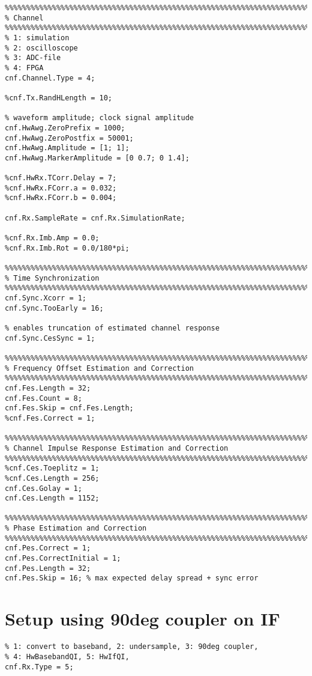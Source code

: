 \begin{appendix}
\begin{verbatim}
%%%%%%%%%%%%%%%%%%%%%%%%%%%%%%%%%%%%%%%%%%%%%%%%%%%%%%%%%%%%%%%%%%%%%%%%%%%%%%%%
% Channel
%%%%%%%%%%%%%%%%%%%%%%%%%%%%%%%%%%%%%%%%%%%%%%%%%%%%%%%%%%%%%%%%%%%%%%%%%%%%%%%%
% 1: simulation
% 2: oscilloscope
% 3: ADC-file
% 4: FPGA
cnf.Channel.Type = 4;

%cnf.Tx.RandHLength = 10;

% waveform amplitude; clock signal amplitude
cnf.HwAwg.ZeroPrefix = 1000;
cnf.HwAwg.ZeroPostfix = 50001;
cnf.HwAwg.Amplitude = [1; 1];
cnf.HwAwg.MarkerAmplitude = [0 0.7; 0 1.4];

%cnf.HwRx.TCorr.Delay = 7;
%cnf.HwRx.FCorr.a = 0.032;
%cnf.HwRx.FCorr.b = 0.004;

cnf.Rx.SampleRate = cnf.Rx.SimulationRate;

%cnf.Rx.Imb.Amp = 0.0;
%cnf.Rx.Imb.Rot = 0.0/180*pi;

%%%%%%%%%%%%%%%%%%%%%%%%%%%%%%%%%%%%%%%%%%%%%%%%%%%%%%%%%%%%%%%%%%%%%%%%%%%%%%%%
% Time Synchronization
%%%%%%%%%%%%%%%%%%%%%%%%%%%%%%%%%%%%%%%%%%%%%%%%%%%%%%%%%%%%%%%%%%%%%%%%%%%%%%%%
cnf.Sync.Xcorr = 1;
cnf.Sync.TooEarly = 16;

% enables truncation of estimated channel response
cnf.Sync.CesSync = 1;

%%%%%%%%%%%%%%%%%%%%%%%%%%%%%%%%%%%%%%%%%%%%%%%%%%%%%%%%%%%%%%%%%%%%%%%%%%%%%%%%
% Frequency Offset Estimation and Correction
%%%%%%%%%%%%%%%%%%%%%%%%%%%%%%%%%%%%%%%%%%%%%%%%%%%%%%%%%%%%%%%%%%%%%%%%%%%%%%%%
cnf.Fes.Length = 32;
cnf.Fes.Count = 8;
cnf.Fes.Skip = cnf.Fes.Length;
%cnf.Fes.Correct = 1;

%%%%%%%%%%%%%%%%%%%%%%%%%%%%%%%%%%%%%%%%%%%%%%%%%%%%%%%%%%%%%%%%%%%%%%%%%%%%%%%%
% Channel Impulse Response Estimation and Correction
%%%%%%%%%%%%%%%%%%%%%%%%%%%%%%%%%%%%%%%%%%%%%%%%%%%%%%%%%%%%%%%%%%%%%%%%%%%%%%%%
%cnf.Ces.Toeplitz = 1;
%cnf.Ces.Length = 256;
cnf.Ces.Golay = 1;
cnf.Ces.Length = 1152;

%%%%%%%%%%%%%%%%%%%%%%%%%%%%%%%%%%%%%%%%%%%%%%%%%%%%%%%%%%%%%%%%%%%%%%%%%%%%%%%%
% Phase Estimation and Correction
%%%%%%%%%%%%%%%%%%%%%%%%%%%%%%%%%%%%%%%%%%%%%%%%%%%%%%%%%%%%%%%%%%%%%%%%%%%%%%%%
cnf.Pes.Correct = 1;
cnf.Pes.CorrectInitial = 1;
cnf.Pes.Length = 32;
cnf.Pes.Skip = 16; % max expected delay spread + sync error
\end{verbatim}


\section{Setup using 90deg coupler on IF}
\begin{verbatim}
% 1: convert to baseband, 2: undersample, 3: 90deg coupler,
% 4: HwBasebandQI, 5: HwIfQI,
cnf.Rx.Type = 5;


\end{verbatim}
\end{appendix}
